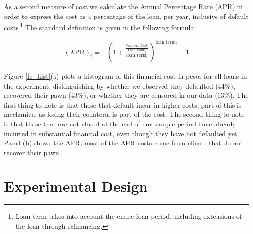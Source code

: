 \documentclass[oneside,11pt]{article}
\begin{document}
As a second measure of cost we calculate the Annual Percentage Rate (APR) in order to express the cost as a percentage of the loan, per year, inclusive of default costs.\footnote{Loan term takes into account the entire loan period, including extensions of the loan through refinancing.} The standard definition is given in the following formula:


\begin{align*}
    (\text{APR})_i =&\left( 1 + \frac{\frac{\text{Financial Cost}_i}{\text{Loan Value}_i}}{\text{loan term}_i}\right)^{\text{loan term}_i}-1 
\end{align*}

\vspace{.1in}

Figure \ref{fc_hist}(a) plots a histogram of this financial cost in pesos for all loans in the experiment, distinguishing by whether we observed they defaulted (44\%), recovered their pawn (43\%), or whether they are censored in our data (13\%). The first thing to note is that those that default incur in higher costs; part of this is mechanical as losing their collateral is part of the cost. The second thing to note is that those that are not closed at the end of our sample period have already incurred in substantial financial cost, even though they have not defaulted yet. Panel (b) shows the APR; most of the APR costs come from clients that do not recover their pawn. 





\section{Experimental Design} \label{Design}
\end{document}
